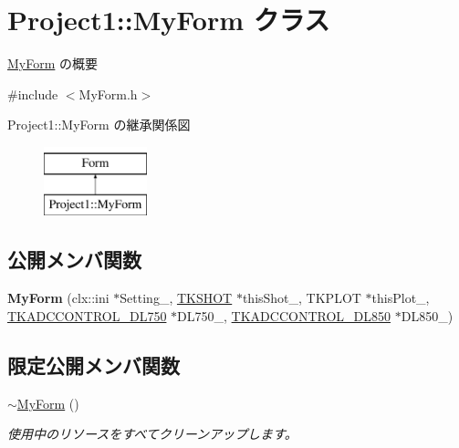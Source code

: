\hypertarget{class_project1_1_1_my_form}{}\section{Project1\+:\+:My\+Form クラス}
\label{class_project1_1_1_my_form}


\hyperlink{class_project1_1_1_my_form}{My\+Form} の概要  




{\ttfamily \#include $<$My\+Form.\+h$>$}

Project1\+:\+:My\+Form の継承関係図\begin{figure}[H]
\begin{center}
\leavevmode
\includegraphics[height=2.000000cm]{class_project1_1_1_my_form}
\end{center}
\end{figure}
\subsection*{公開メンバ関数}
\begin{DoxyCompactItemize}
\item 
\mbox{\label{class_project1_1_1_my_form_a2d96004e6380e1bdfffe4675083b6769}} 
{\bfseries My\+Form} (clx\+::ini $\ast$Setting\+\_\+, \hyperlink{class_t_k_s_h_o_t}{T\+K\+S\+H\+OT} $\ast$this\+Shot\+\_\+, T\+K\+P\+L\+OT $\ast$this\+Plot\+\_\+, \hyperlink{class_t_k_a_d_c_c_o_n_t_r_o_l___d_l750}{T\+K\+A\+D\+C\+C\+O\+N\+T\+R\+O\+L\+\_\+\+D\+L750} $\ast$D\+L750\+\_\+, \hyperlink{class_t_k_a_d_c_c_o_n_t_r_o_l___d_l850}{T\+K\+A\+D\+C\+C\+O\+N\+T\+R\+O\+L\+\_\+\+D\+L850} $\ast$D\+L850\+\_\+)
\end{DoxyCompactItemize}
\subsection*{限定公開メンバ関数}
\begin{DoxyCompactItemize}
\item 
\hyperlink{class_project1_1_1_my_form_a501b2b4481b72877fc73101f1d6f26be}{$\sim$\+My\+Form} ()
\begin{DoxyCompactList}\small\item\em 使用中のリソースをすべてクリーンアップします。 \end{DoxyCompactList}\end{DoxyCompactItemize}



